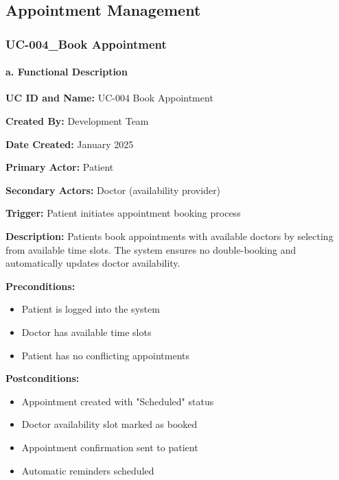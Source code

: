 \documentclass[12pt,a4paper]{article}
\begin{document}
\subsection{Appointment Management}

\subsubsection{UC-004\_Book Appointment}

\paragraph{a. Functional Description}

\textbf{UC ID and Name:} UC-004 Book Appointment

\textbf{Created By:} Development Team

\textbf{Date Created:} January 2025

\textbf{Primary Actor:} Patient

\textbf{Secondary Actors:} Doctor (availability provider)

\textbf{Trigger:} Patient initiates appointment booking process

\textbf{Description:} Patients book appointments with available doctors by selecting from available time slots. The system ensures no double-booking and automatically updates doctor availability.

\textbf{Preconditions:}
\begin{itemize}
    \item Patient is logged into the system
    \item Doctor has available time slots
    \item Patient has no conflicting appointments
\end{itemize}

\textbf{Postconditions:}
\begin{itemize}
    \item Appointment created with "Scheduled" status
    \item Doctor availability slot marked as booked
    \item Appointment confirmation sent to patient
    \item Automatic reminders scheduled
\end{itemize}
\end{document}
